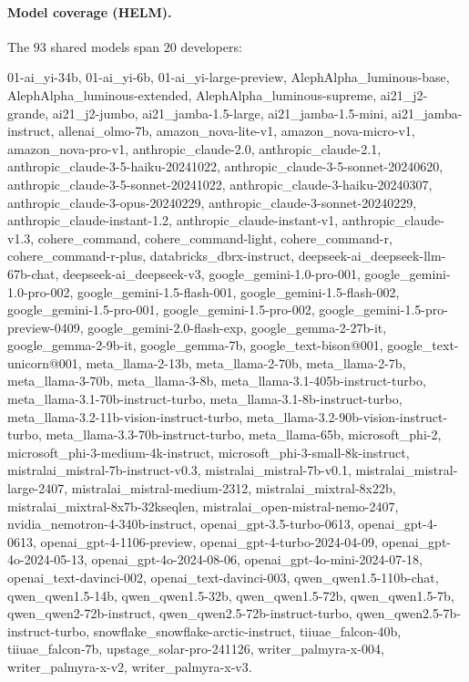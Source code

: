 \documentclass{article}
\theoremstyle{definition}
\theoremstyle{plain}
\begin{document}
\paragraph{Model coverage (HELM).} The $93$ shared models span $20$ developers:
{\footnotesize\ttfamily\raggedright 01-ai\_yi-34b, 01-ai\_yi-6b, 01-ai\_yi-large-preview,
AlephAlpha\_luminous-base, AlephAlpha\_luminous-extended, AlephAlpha\_luminous-supreme,
ai21\_j2-grande, ai21\_j2-jumbo, ai21\_jamba-1.5-large, ai21\_jamba-1.5-mini,
ai21\_jamba-instruct, allenai\_olmo-7b, amazon\_nova-lite-v1, amazon\_nova-micro-v1,
amazon\_nova-pro-v1, anthropic\_claude-2.0, anthropic\_claude-2.1,
anthropic\_claude-3-5-haiku-20241022, anthropic\_claude-3-5-sonnet-20240620,
anthropic\_claude-3-5-sonnet-20241022, anthropic\_claude-3-haiku-20240307,
anthropic\_claude-3-opus-20240229, anthropic\_claude-3-sonnet-20240229,
anthropic\_claude-instant-1.2, anthropic\_claude-instant-v1, anthropic\_claude-v1.3,
cohere\_command, cohere\_command-light, cohere\_command-r, cohere\_command-r-plus,
databricks\_dbrx-instruct, deepseek-ai\_deepseek-llm-67b-chat, deepseek-ai\_deepseek-v3,
google\_gemini-1.0-pro-001, google\_gemini-1.0-pro-002, google\_gemini-1.5-flash-001,
google\_gemini-1.5-flash-002, google\_gemini-1.5-pro-001, google\_gemini-1.5-pro-002,
google\_gemini-1.5-pro-preview-0409, google\_gemini-2.0-flash-exp, google\_gemma-2-27b-it,
google\_gemma-2-9b-it, google\_gemma-7b, google\_text-bison@001, google\_text-unicorn@001,
meta\_llama-2-13b, meta\_llama-2-70b, meta\_llama-2-7b, meta\_llama-3-70b, meta\_llama-3-8b,
meta\_llama-3.1-405b-instruct-turbo, meta\_llama-3.1-70b-instruct-turbo,
meta\_llama-3.1-8b-instruct-turbo, meta\_llama-3.2-11b-vision-instruct-turbo,
meta\_llama-3.2-90b-vision-instruct-turbo, meta\_llama-3.3-70b-instruct-turbo,
meta\_llama-65b, microsoft\_phi-2, microsoft\_phi-3-medium-4k-instruct,
microsoft\_phi-3-small-8k-instruct, mistralai\_mistral-7b-instruct-v0.3,
mistralai\_mistral-7b-v0.1, mistralai\_mistral-large-2407, mistralai\_mistral-medium-2312,
mistralai\_mixtral-8x22b, mistralai\_mixtral-8x7b-32kseqlen,
mistralai\_open-mistral-nemo-2407, nvidia\_nemotron-4-340b-instruct,
openai\_gpt-3.5-turbo-0613, openai\_gpt-4-0613, openai\_gpt-4-1106-preview,
openai\_gpt-4-turbo-2024-04-09, openai\_gpt-4o-2024-05-13, openai\_gpt-4o-2024-08-06,
openai\_gpt-4o-mini-2024-07-18, openai\_text-davinci-002, openai\_text-davinci-003,
qwen\_qwen1.5-110b-chat, qwen\_qwen1.5-14b, qwen\_qwen1.5-32b, qwen\_qwen1.5-72b,
qwen\_qwen1.5-7b, qwen\_qwen2-72b-instruct, qwen\_qwen2.5-72b-instruct-turbo,
qwen\_qwen2.5-7b-instruct-turbo, snowflake\_snowflake-arctic-instruct, tiiuae\_falcon-40b,
tiiuae\_falcon-7b, upstage\_solar-pro-241126, writer\_palmyra-x-004, writer\_palmyra-x-v2,
writer\_palmyra-x-v3.\par}
\end{document}
